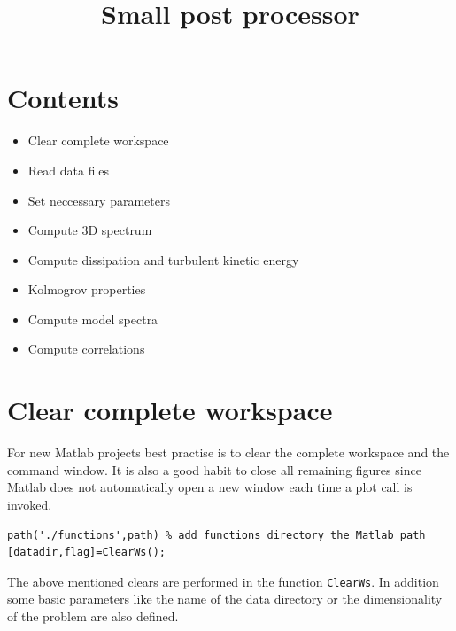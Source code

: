 \documentclass[ntfdMod]{elsarticle}
\title{Small post processor}
\begin{document}
\maketitle

    
    
\section{Contents}

\begin{itemize}
\setlength{\itemsep}{-1ex}
   \item Clear complete workspace
   \item Read data files
   \item Set neccessary parameters
   \item Compute 3D spectrum
   \item Compute dissipation and turbulent kinetic energy
   \item Kolmogrov properties
   \item Compute model spectra
   \item Compute correlations
\end{itemize}


\section{Clear complete workspace}

\begin{par}
For new Matlab projects best practise is to clear the complete workspace and the command window. It is also a good habit to close all remaining figures since Matlab does not automatically open a new window each time a plot call is invoked.
\end{par} \vspace{1em}
\begin{lstlisting}
path('./functions',path) % add functions directory the Matlab path
[datadir,flag]=ClearWs();
\end{lstlisting}
\begin{par}

The above mentioned clears are performed in the function \verb|ClearWs|.
In addition some basic parameters like the name of the data
directory or the dimensionality of the problem are also defined.


\end{par} \vspace{1em}
\end{document}
